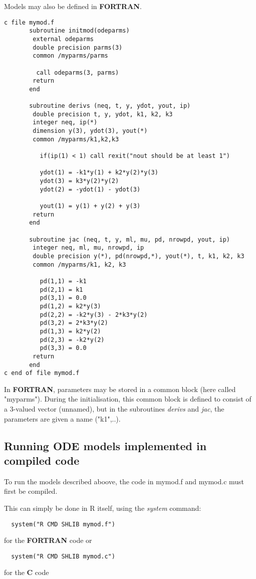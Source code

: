 \documentclass[english]{article}
\newcommand{\FOR}{\textbf{\textsf{FORTRAN}}\xspace}
\newcommand{\C}{\textbf{\textsf{C}}\xspace}
\begin{document}
Models may also be defined in \FOR. 
\begin{verbatim}
c file mymod.f
       subroutine initmod(odeparms)
        external odeparms
        double precision parms(3)
        common /myparms/parms

         call odeparms(3, parms)
        return
       end
    
       subroutine derivs (neq, t, y, ydot, yout, ip)
        double precision t, y, ydot, k1, k2, k3
        integer neq, ip(*)
        dimension y(3), ydot(3), yout(*)
        common /myparms/k1,k2,k3

          if(ip(1) < 1) call rexit("nout should be at least 1")

          ydot(1) = -k1*y(1) + k2*y(2)*y(3)
          ydot(3) = k3*y(2)*y(2)
          ydot(2) = -ydot(1) - ydot(3)

          yout(1) = y(1) + y(2) + y(3)
        return
       end

       subroutine jac (neq, t, y, ml, mu, pd, nrowpd, yout, ip)
        integer neq, ml, mu, nrowpd, ip
        double precision y(*), pd(nrowpd,*), yout(*), t, k1, k2, k3
        common /myparms/k1, k2, k3

          pd(1,1) = -k1
          pd(2,1) = k1
          pd(3,1) = 0.0
          pd(1,2) = k2*y(3)
          pd(2,2) = -k2*y(3) - 2*k3*y(2)
          pd(3,2) = 2*k3*y(2)
          pd(1,3) = k2*y(2)
          pd(2,3) = -k2*y(2)
          pd(3,3) = 0.0
        return
       end
c end of file mymod.f
\end{verbatim}
   
In \FOR, parameters may be stored in a common block (here called "myparms").
During the initialisation, this common block is defined to consist of a 3-valued vector
(unnamed), but in the subroutines \emph{derivs} and \emph{jac}, the parameters are
given a name ("k1",..).

\subsection{Running ODE models implemented in compiled code}
  
To run the models described aboove, the code in mymod.f and mymod.c must first be compiled.

This can simply be done in R itself, using the \emph{system} command:  
\begin{verbatim}
  system("R CMD SHLIB mymod.f")
\end{verbatim}
for the \FOR code or 
\begin{verbatim}
  system("R CMD SHLIB mymod.c")
\end{verbatim}
for the \C code  
\end{document}
